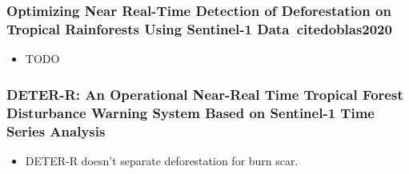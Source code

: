 \documentclass{beamer}
\begin{document}
\begin{frame}[t, allowframebreaks]
    \frametitle{Optimizing Near Real-Time Detection of Deforestation on 
    Tropical Rainforests Using Sentinel-1 Data~cite{doblas2020}}
    \begin{itemize}
        \item TODO
    \end{itemize}
\end{frame}



\begin{frame}[t, allowframebreaks]
    \frametitle{DETER-R: An Operational Near-Real Time Tropical Forest 
    Disturbance Warning System Based on Sentinel-1 Time Series Analysis~\cite{doblas2022}}
    \begin{itemize}
        \item DETER-R doesn't separate deforestation for burn scar.

\end{itemize}
\end{frame}
\end{document}
